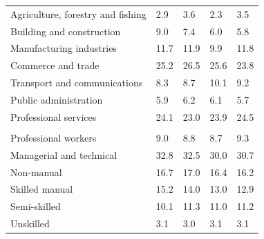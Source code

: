 \documentclass{article}
\begin{document}
\begin{table}[h]
\begin{tabular}{KTTTT}
    \hline
Agriculture, forestry and fishing  & 2.9& 3.6& 2.3& 3.5\\
Building and construction & 9.0& 7.4& 6.0& 5.8\\
Manufacturing industries & 11.7& 11.9&  9.9& 11.8\\
Commerce and trade  & 25.2& 26.5& 25.6& 23.8\\
Transport and communications  &  8.3&  8.7& 10.1&  9.2\\
Public administration & 5.9& 6.2& 6.1& 5.7\\
Professional services & 24.1& 23.0& 23.9& 24.5\\
\hline
    \\ 
    \hline
Professional workers  & 9.0& 8.8 & 8.7& 9.3\\
Managerial and technical & 32.8& 32.5& 30.0& 30.7\\
Non-manual & 16.7& 17.0& 16.4& 16.2\\
Skilled manual & 15.2& 14.0& 13.0& 12.9\\
Semi-skilled & 10.1& 11.3& 11.0& 11.2\\
Unskilled  & 3.1& 3.0& 3.1& 3.1\\
\end{tabular}
\end{table}
\pagebreak
\end{document}
